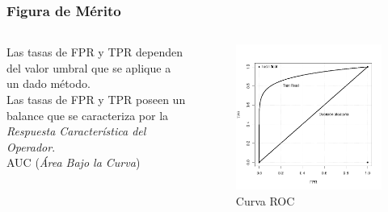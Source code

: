 \documentclass[11pt]{beamer}
\begin{document}
\begin{frame} \frametitle{Figura de M\'erito}
 \small
 \begin{columns}[T]
\begin{column}{0.48\textwidth}
 Las tasas de FPR y TPR dependen del valor umbral que se aplique a un dado m\'etodo.\\ 
 Las tasas de FPR y TPR poseen un balance que se caracteriza por la \textit{Respuesta Caracter\'{i}stica del Operador}.\\ 
 AUC (\textit{\'Area Bajo la Curva})
 \end{column}
 \begin{column}{0.55\textwidth}
 \begin{figure}
 \centering
 \includegraphics[width=\textwidth]{./images/imgs_seminario1/ROC.png}
 \caption{\scriptsize{Curva ROC}}
\end{figure}\pause
\end{column}
 \end{columns}
\end{frame}



\end{document}
